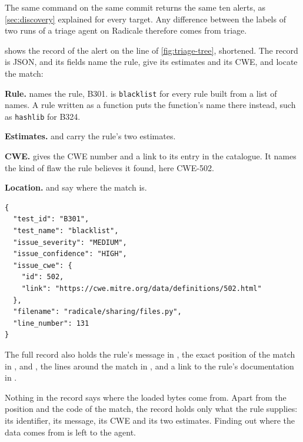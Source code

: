 The same command on the same commit returns the same ten alerts, as \cref{sec:discovery} explained
for every target. Any difference between the labels of two runs of a triage agent on Radicale
therefore comes from triage.

 shows the record of the alert on the line of \cref{fig:triage-tree},
shortened. The record is JSON, and its fields name the rule, give its estimates and its CWE, and
locate the match:
\bi
\item \textbf{Rule.}  names the rule, B301.  is
\texttt{blacklist} for every rule built from a list of names. A rule written as a function puts the
function's name there instead, such as \texttt{hashlib} for B324.
\item \textbf{Estimates.}  and  carry the rule's
two estimates.
\item \textbf{CWE.}  gives the CWE number and a link to its entry in the
catalogue. It names the kind of flaw the rule believes it found, here CWE-502.
\item \textbf{Location.}  and  say where the match is.
\ei

\noindent\begin{minipage}{\linewidth}
\begin{lstlisting}[breakatwhitespace=true, basicstyle=\ttfamily\footnotesize, caption={One Bandit alert record, as the agent receives it, with its message, code, position and documentation fields cut.}, label=lst:triage-alert]
{
  "test_id": "B301",
  "test_name": "blacklist",
  "issue_severity": "MEDIUM",
  "issue_confidence": "HIGH",
  "issue_cwe": {
    "id": 502,
    "link": "https://cwe.mitre.org/data/definitions/502.html"
  },
  "filename": "radicale/sharing/files.py",
  "line_number": 131
}
\end{lstlisting}
\end{minipage}

The full record also holds the rule's message in , the exact position of the
match in ,  and , the lines around
the match in , and a link to the rule's documentation in .

Nothing in the record says where the loaded bytes come from. Apart from the position and the code of
the match, the record holds only what the rule supplies: its identifier, its message, its CWE and its
two estimates. Finding out where the data comes from is left to the agent.

